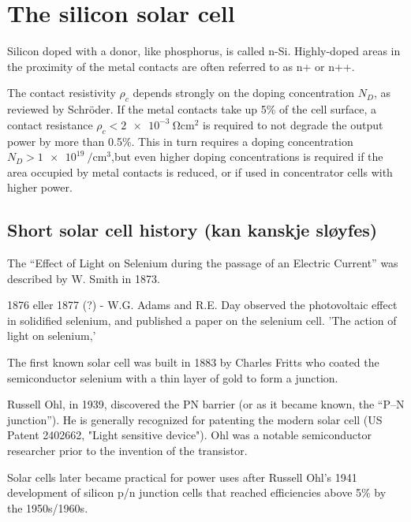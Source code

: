 \documentclass[11pt,bibliography=totoc,index=totoc]{scrbook}   %
\begin{document}
%
\section{The silicon solar cell}\label{sec:SiliconSolarCell}
%

Silicon doped with a donor, like phosphorus, is called n-Si. Highly-doped areas in the proximity of the metal contacts are often referred to as n+ or n++.

The contact resistivity $\rho_c$ depends strongly on the doping concentration $N_D$, as reviewed by Schröder\cite{Schroder:1984}. 
If the metal contacts take up 5\% of the cell surface, a contact resistance $\rho_c < \SI{2e-3}{\ohm\centi\metre\squared}$ is required to not degrade the output power by more than 0.5\%. This in turn requires a doping concentration $N_D > \SI{1e19}{\per\centi\metre\cubed}$,but even higher doping concentrations is required if the area occupied by metal contacts is reduced, or if used in concentrator cells with higher power.

%
\subsection{Short solar cell history (kan kanskje sløyfes)}
%

The ``Effect of Light on Selenium during the passage of an Electric Current''
was described by W. Smith in 1873\cite{Smith:1873}.

1876 eller 1877 (?) - W.G. Adams and R.E. Day observed the photovoltaic effect in solidified 
selenium, and published a paper on the selenium cell. 'The action of light 
on selenium,'\cite{Adams:1876}

The first known solar cell was built in 1883 by Charles Fritts who coated the
semiconductor selenium with a thin layer of gold to form a junction.

Russell Ohl, in 1939, discovered the PN barrier (or as it became known, 
the “P–N junction”). He is generally recognized for patenting the modern solar 
cell (US Patent 2402662, "Light sensitive device"). Ohl was a notable 
semiconductor researcher prior to the invention of the transistor. 

Solar cells later became practical for power uses after Russell Ohl's 1941 
development of silicon p/n junction cells that reached efficiencies above 
5\% by the 1950s/1960s.
\end{document}
